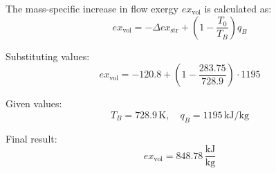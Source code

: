 The mass-specific increase in flow exergy \( ex_{\text{vol}} \) is calculated as:  
\[
ex_{\text{vol}} = -\Delta ex_{\text{str}} + \left( 1 - \frac{T_0}{T_B} \right) q_B
\]  

Substituting values:  
\[
ex_{\text{vol}} = -120.8 + \left( 1 - \frac{283.75}{728.9} \right) \cdot 1195
\]  

Given values:  
\[
T_B = 728.9 \, \text{K}, \quad q_B = 1195 \, \text{kJ/kg}
\]  

Final result:  
\[
ex_{\text{vol}} = 848.78 \, \frac{\text{kJ}}{\text{kg}}
\]